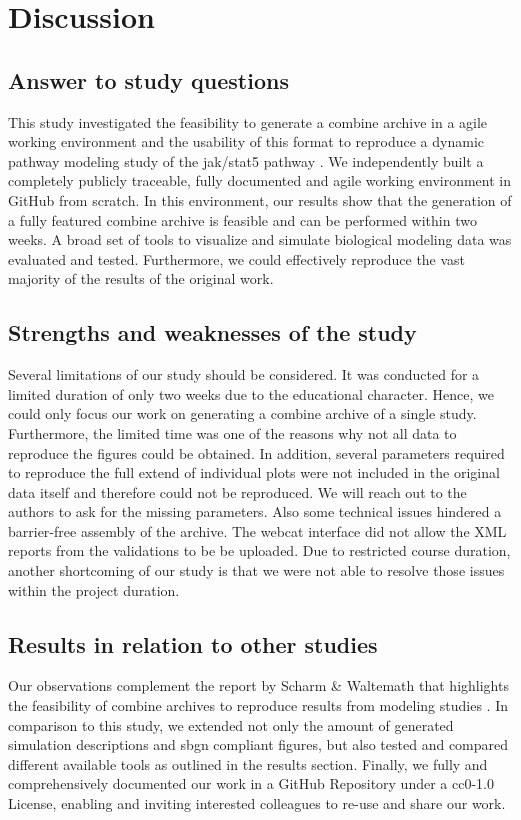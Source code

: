 \section*{Discussion}

\subsection*{Answer to study questions}
This study investigated the feasibility to generate a \ac{combine} archive in a agile working environment and the usability of this format to reproduce a dynamic pathway modeling study of the \ac{jak}/\ac{stat}5 pathway \cite{bachmannmodel}. We independently built a completely publicly traceable, fully documented and agile working environment in GitHub from scratch. In this environment, our results show that the generation of a fully featured \ac{combine} archive is feasible and can be performed within two weeks. A broad set of tools to visualize and simulate biological modeling data was evaluated and tested. Furthermore, we could effectively reproduce the vast majority of the results of the original work. 

\subsection*{Strengths and weaknesses of the study}
Several limitations of our study should be considered. It was conducted for a limited duration of only two weeks due to the educational character. Hence, we could only focus our work on generating a \ac{combine} archive of a single study. Furthermore, the limited time was one of the reasons why not all data to reproduce the figures could be obtained. In addition, several parameters required to reproduce the full extend of individual plots were not included in the original data itself and therefore could not be reproduced. We will reach out to the authors to ask for the missing parameters.
Also some technical issues hindered a barrier-free assembly of the archive. The \ac{webcat} interface did not allow the XML reports from the validations to be be uploaded. Due to restricted course duration, another shortcoming of our study is that we were not able to resolve those issues within the project duration.

\subsection*{Results in relation to other studies}
Our observations complement the report by Scharm \& Waltemath \cite{combine} that highlights the feasibility of \ac{combine} archives to reproduce results from modeling studies \cite{calzone2007dynamical}. In comparison to this study, we extended not only the amount of generated simulation descriptions and \ac{sbgn} compliant figures, but also tested and compared different available tools as outlined in the results section. Finally, we fully and comprehensively documented our work in a GitHub Repository under a \ac{cc}0-1.0 License, enabling and inviting interested colleagues to re-use and share our work.

